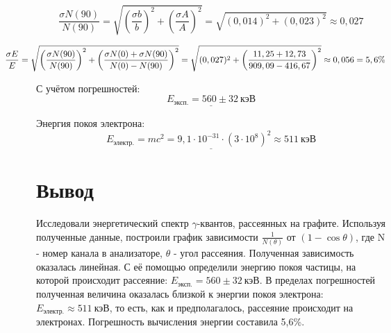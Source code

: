 \documentclass[letterpaper,12pt]{article}
\begin{document}
\begin{enumerate}
		\begin{equation*}
	\dfrac{\sigma N(90)}{N(90)}=\sqrt{\left(\frac{\sigma b}{b}\right)^2 + \left(\frac{\sigma A}{A}\right)^2}=\sqrt{(0,014)^2 + (0,023)^2}\approx0,027
		\end{equation*}
		
			
		\begin{equation*}
		\hspace{-1,3cm}\dfrac{\sigma E}{E}=\sqrt{\left(\frac{\sigma N(90)}{N(90)}\right)^2+\left(\frac{\sigma N(0)+\sigma N(90)}{N(0)-N(90)}\right)^2}=\sqrt{(0,027)^2+\left(\frac{11,25+12,73}{909,09-416,67}\right)^2}\approx0,056=5,6\%
		\end{equation*}	
		
		\vspace{5mm}
		С учётом погрешностей:
		\begin{equation*}
		\underline{E_{\text{эксп.}} = 560\pm32 ~\text{кэВ}}
		\end{equation*}
			
		Энергия покоя электрона:
		\begin{equation*}
		\underline{E_{\text{электр.}}=mc^2=9,1\cdot 10^{-31}\cdot (3\cdot 10^8)^2 \approx 511~\text{кэВ}}
		\end{equation*}
		
		\end{enumerate}
		
	\section{Вывод}
	Исследовали энергетический спектр $\gamma$-квантов, рассеянных на графите.  Используя полученные данные, построили график зависимости $\frac{1}{N(\theta)}$ от $(1-\cos\theta)$, где N - номер канала в анализаторе, $\theta$ - угол рассеяния. Полученная зависимость оказалась линейная. С её помощью определили энергию покоя частицы, на которой происходит рассеяние: $E_{\text{эксп.}}=560\pm32~\text{кэВ}$. В пределах погрешностей полученная величина оказалась близкой к энергии покоя электрона: $E_{\text{электр.}}\approx511~\text{кэВ}$, то есть, как и предполагалось, рассеяние происходит на электронах. Погрешность вычисления энергии составила 5,6\%.
	
	
	
\end{document}
